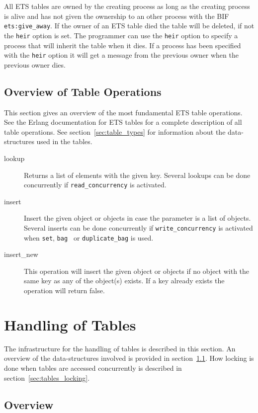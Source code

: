 \documentclass[aps,pre,preprint,nofootinbib]{revtex4}
\begin{document}
All ETS tables are owned by the creating process as long as the creating process is alive and has not given the ownership to an other process with the BIF \verb|ets:give_away|.
If the owner of an ETS table died the table will be deleted, if not the \verb|heir| option is set.
The programmer can use the \verb|heir| option to specify a process that will inherit the table when it dies. 
If a process has been specified with the \verb|heir| option it will get a message from the previous owner when the previous owner dies.

\subsection{Overview of Table Operations}

This section gives an overview of the most fundamental ETS table operations. 
See the Erlang documentation for ETS tables for a complete description of all table operations. 
See section~\ref{sec:table_types} for information about the data-structures used in the tables.

\begin{description}
 \item[lookup] 
 Returns a list of elements with the given key. 
 Several lookups can be done concurrently if \verb|read_concurrency| is activated.
 \item[insert]
 Insert the given object or objects in case the parameter is a list of objects.
 Several inserts can be done concurrently if \verb|write_concurrency| is activated when \verb|set|, \verb|bag | or \verb|duplicate_bag| is used.
 \item[insert\_new]
 This operation will insert the given object or objects if no object with the same key as any of the object(s) exists. 
 If a key already exists the operation will return false.
 
\end{description}


\section{Handling of Tables}

The infrastructure for the handling of tables is described in this section. 
An overview of the data-structures involved is provided in section~\ref{sec:tables_overview}.
How locking is done when tables are accessed concurrently is described in section~\ref{sec:tables_locking}.

\subsection{Overview} \label{sec:tables_overview}
\end{document}
